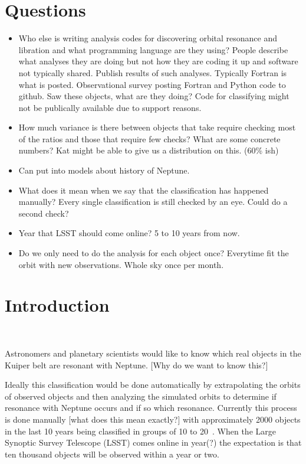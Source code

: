 \documentclass[conference]{IEEEtran}
\begin{document}
\IEEEpeerreviewmaketitle

\section{Questions}

\begin{itemize}
\item Who else is writing analysis codes for discovering orbital resonance and libration and
what programming language are they using?
People describe what analyses they are doing but not how they are coding it up and 
software not typically shared. Publish results of such analyses.
Typically Fortran is what is posted.
Observational survey posting Fortran and Python code to github.
Saw these objects, what are they doing?  Code for classifying might not be publically
available due to support reasons.

\item How much variance is there between objects that take require checking most of the
ratios and those that require few checks?  What are some concrete numbers?
Kat might be able to give us a distribution on this. (60\% ish)

\item Can put into models about history of Neptune.

\item What does it mean when we say that the classification has happened manually?
Every single classification is still checked by an eye.  Could do a second check?

\item Year that LSST should come online?  5 to 10 years from now.

\item Do we only need to do the analysis for each object once?
Everytime fit the orbit with new observations.  Whole sky once per month.
\end{itemize}

\section{Introduction}

~\cite{ChapelOverviewJan13}

Astronomers and planetary scientists would like to know which real
objects in the Kuiper belt are resonant with Neptune.
[Why do we want to know this?]

Ideally this classification would be done automatically by 
extrapolating the orbits of observed objects and then analyzing
the simulated orbits to determine if resonance with Neptune occurs
and if so which resonance.  Currently this process is done manually
[what does this mean exactly?] with approximately
2000 objects in the last 10 years being classified in
groups of 10 to 20~\cite{ClassificationCite}.
When the Large Synoptic Survey Telescope (LSST) comes online in  year(?)
the expectation is that ten thousand objects
will be observed within a year or two.
\end{document}
